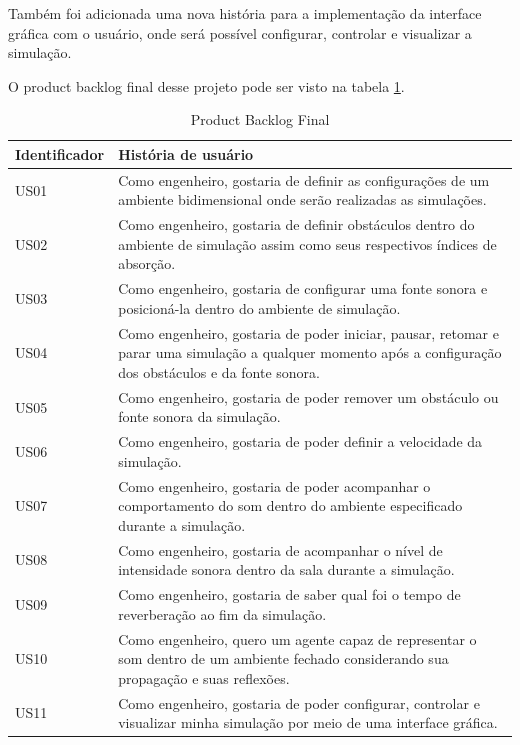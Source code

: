 Também foi adicionada uma nova história para a implementação da interface gráfica com o usuário, onde será possível configurar, controlar e visualizar a simulação.

O product backlog final desse projeto pode ser visto na tabela \ref{backlog_final}.

\begin{table}[!htb]
\centering
\begin{tabular}{|p{4cm}|p{10cm}|}\hline
Identificador & História de usuário\\ \hline
US01 & Como engenheiro, gostaria de definir as configurações de um ambiente bidimensional onde serão realizadas as simulações.\\ \hline
US02 & Como engenheiro, gostaria de definir obstáculos dentro do ambiente de simulação assim como seus respectivos índices de absorção.\\ \hline
US03 & Como engenheiro, gostaria de configurar uma fonte sonora e posicioná-la dentro do ambiente de simulação.\\ \hline
US04 & Como engenheiro, gostaria de poder iniciar, pausar, retomar e parar uma simulação a qualquer momento após a configuração dos obstáculos e da fonte sonora. \\ \hline
US05 & Como engenheiro, gostaria de poder remover um obstáculo ou fonte sonora da simulação.\\ \hline
US06 & Como engenheiro, gostaria de poder definir a velocidade da simulação. \\ \hline
US07 & Como engenheiro, gostaria de poder acompanhar o comportamento do som dentro do ambiente especificado durante a simulação. \\ \hline
US08 & Como engenheiro, gostaria de acompanhar o nível de intensidade sonora dentro da sala durante a simulação. \\ \hline
US09 & Como engenheiro, gostaria de saber qual foi o tempo de reverberação ao fim da simulação. \\ \hline
US10 & Como engenheiro, quero um agente capaz de representar o som dentro de um ambiente fechado considerando sua propagação e suas reflexões. \\ \hline
US11 & Como engenheiro, gostaria de poder configurar, controlar e visualizar minha simulação por meio de uma interface gráfica. \\ \hline

\end{tabular}
\caption{Product Backlog Final}\label{backlog_final}
\end{table}

